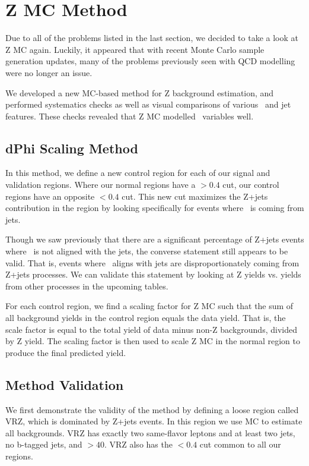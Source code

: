 \section{Z MC Method}

Due to all of the problems listed in the last section, we decided to take a look at Z MC again. Luckily, it appeared that with recent Monte Carlo sample generation updates, many of the problems previously seen with QCD modelling were no longer an issue.

We developed a new MC-based method for Z background estimation, and performed systematics checks as well as visual comparisons of various \MET\ and jet features. These checks revealed that Z MC modelled \MET\ variables well.

\subsection*{dPhi Scaling Method}

In this method, we define a new control region for each of our signal and validation regions. Where our normal regions have a \mindphijm$>0.4$ cut, our control regions have an opposite \mindphijm$<0.4$ cut. This new cut maximizes the Z+jets contribution in the region by looking specifically for events where \MET\ is coming from jets.

Though we saw previously that there are a significant percentage of Z+jets events where \MET\ is not aligned with the jets, the converse statement still appears to be valid. That is, events where \MET\ aligns with jets are disproportionately coming from Z+jets processes. We can validate this statement by looking at Z yields vs. yields from other processes in the upcoming tables.

For each control region, we find a scaling factor for Z MC such that the sum of all background yields in the control region equals the data yield. That is, the scale factor is equal to the total yield of data minus non-Z backgrounds, divided by Z yield. The scaling factor is then used to scale Z MC in the normal region to produce the final predicted yield.

\subsection*{Method Validation}

We first demonstrate the validity of the method by defining a loose region called VRZ, which is dominated by Z+jets events. In this region we use MC to estimate all backgrounds. VRZ has exactly two same-flavor leptons and at least two jets, no b-tagged jets, and \ptll$>40$. VRZ also has the \mindphijm$<0.4$ cut common to all our regions.

